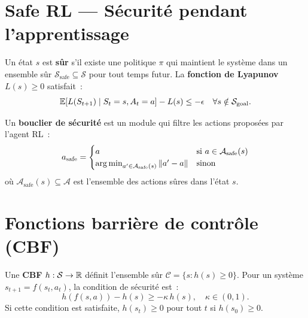 \section{Safe RL --- S\'ecurit\'e pendant l'apprentissage}

\begin{definition}
Un \'etat $s$ est \textbf{s\^ur} s'il existe une politique $\pi$ qui maintient
le syst\`eme dans un ensemble s\^ur $\mathcal{S}_{\text{safe}} \subseteq \mathcal{S}$
pour tout temps futur. La \textbf{fonction de Lyapunov} $L(s) \geq 0$ satisfait~:
\[
    \mathbb{E}[L(S_{t+1}) \mid S_t = s, A_t = a] - L(s) \leq -\epsilon
    \quad \forall s \notin \mathcal{S}_{\text{goal}}.
\]
\end{definition}

\begin{definition}
Un \textbf{bouclier de s\'ecurit\'e} est un module qui filtre les actions
propos\'ees par l'agent RL~:
\[
    a_{\text{safe}} = \begin{cases}
        a & \text{si } a \in \mathcal{A}_{\text{safe}}(s) \\
        \operatorname*{arg\,min}_{a' \in \mathcal{A}_{\text{safe}}(s)} \|a' - a\| & \text{sinon}
    \end{cases}
\]
o\`u $\mathcal{A}_{\text{safe}}(s) \subseteq \mathcal{A}$ est l'ensemble des
actions s\^ures dans l'\'etat $s$.
\end{definition}

\section{Fonctions barri\`ere de contr\^ole (CBF)}

\begin{definition}
Une \textbf{CBF} $h : \mathcal{S} \to \mathbb{R}$ d\'efinit l'ensemble s\^ur
$\mathcal{C} = \{s : h(s) \geq 0\}$. Pour un syst\`eme $s_{t+1} = f(s_t, a_t)$,
la condition de s\'ecurit\'e est~:
\[
    h(f(s, a)) - h(s) \geq -\kappa \, h(s), \quad \kappa \in (0, 1).
\]
Si cette condition est satisfaite, $h(s_t) \geq 0$ pour tout $t$ si $h(s_0) \geq 0$.
\end{definition}

